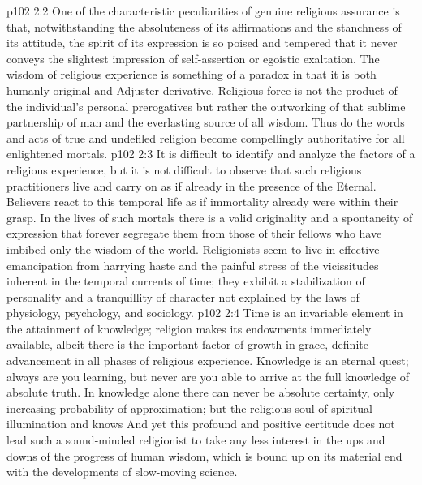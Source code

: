 \vs p102 2:2 One of the characteristic peculiarities of genuine religious assurance is that, notwithstanding the absoluteness of its affirmations and the stanchness of its attitude, the spirit of its expression is so poised and tempered that it never conveys the slightest impression of self\hyp{}assertion or egoistic exaltation. The wisdom of religious experience is something of a paradox in that it is both humanly original and Adjuster derivative. Religious force is not the product of the individual’s personal prerogatives but rather the outworking of that sublime partnership of man and the everlasting source of all wisdom. Thus do the words and acts of true and undefiled religion become compellingly authoritative for all enlightened mortals.
\vs p102 2:3 It is difficult to identify and analyze the factors of a religious experience, but it is not difficult to observe that such religious practitioners live and carry on as if already in the presence of the Eternal. Believers react to this temporal life as if immortality already were within their grasp. In the lives of such mortals there is a valid originality and a spontaneity of expression that forever segregate them from those of their fellows who have imbibed only the wisdom of the world. Religionists seem to live in effective emancipation from harrying haste and the painful stress of the vicissitudes inherent in the temporal currents of time; they exhibit a stabilization of personality and a tranquillity of character not explained by the laws of physiology, psychology, and sociology.
\vs p102 2:4 \pc Time is an invariable element in the attainment of knowledge; religion makes its endowments immediately available, albeit there is the important factor of growth in grace, definite advancement in all phases of religious experience. Knowledge is an eternal quest; always are you learning, but never are you able to arrive at the full knowledge of absolute truth. In knowledge alone there can never be absolute certainty, only increasing probability of approximation; but the religious soul of spiritual illumination  and knows  And yet this profound and positive certitude does not lead such a sound\hyp{}minded religionist to take any less interest in the ups and downs of the progress of human wisdom, which is bound up on its material end with the developments of slow\hyp{}moving science.

